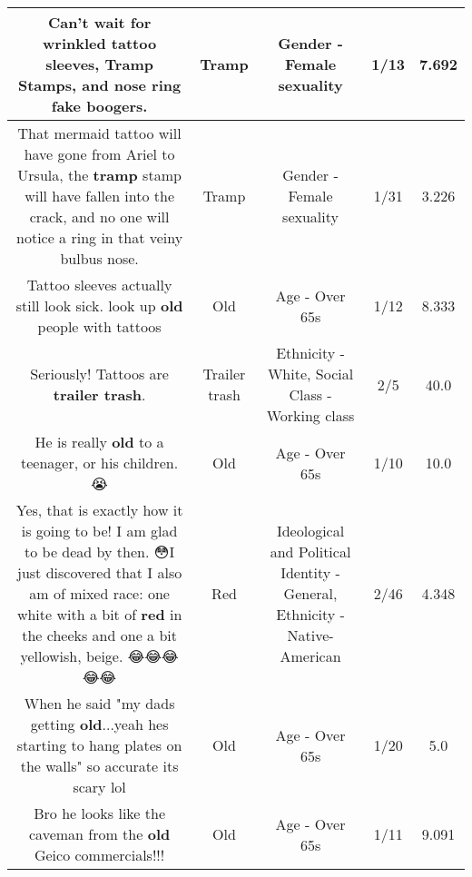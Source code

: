 \documentclass[11pt]{article}
\newlength\mylength
\begin{document}
\begin{center}
\begin{longtable}{|C{.65\mylength}|C{.30\mylength}|C{.12\mylength}|C{.12\mylength}|C{.12\mylength}|}
  \small Can't wait for wrinkled tattoo sleeves, \textbf{Tramp} Stamps, and nose ring fake boogers.\normalsize   & Tramp & Gender - Female sexuality & 1/13 & 7.692 \\  \hline
  \small That mermaid tattoo will have gone from Ariel to Ursula, the \textbf{tramp} stamp will have fallen into the crack, and no one will notice a ring in that veiny bulbus nose.\normalsize   & Tramp & Gender - Female sexuality & 1/31 & 3.226 \\  \hline
  \small Tattoo sleeves actually  still look sick. look up \textbf{old} people with tattoos\normalsize   & Old & Age - Over 65s & 1/12 & 8.333 \\  \hline
  \small Seriously! Tattoos are \textbf{t\textbf{railer trash}}.\normalsize   & Trailer trash & Ethnicity - White, Social Class - Working class & 2/5 & 40.0 \\  \hline
  \small He is really \textbf{old} to a teenager, or his children.😭\normalsize   & Old & Age - Over 65s & 1/10 & 10.0 \\  \hline
  \small Yes, that is exactly how it is going to be! I am glad to be dead by then. 😳I just discovered that I also am of mixed race: one white with a bit of \textbf{r\textbf{ed}} in the cheeks and one a bit yellowish, beige. 😂😂😂😂😂\normalsize   & Red &  Ideological and Political Identity - General, Ethnicity - Native-American & 2/46 & 4.348 \\  \hline
  \small When he said "my dads getting \textbf{old}...yeah hes starting to hang plates on the walls" so accurate its scary lol\normalsize   & Old & Age - Over 65s & 1/20 & 5.0 \\  \hline
  \small Bro he looks like the caveman from the \textbf{old} Geico commercials!!!\normalsize   & Old & Age - Over 65s & 1/11 & 9.091 \\  \hline

\end{longtable}
\end{center}
\end{document}
